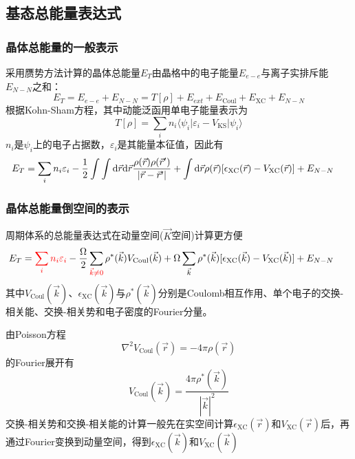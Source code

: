 \documentclass[cjk,slidestop,compress,mathserif,blue]{beamer}
\begin{document}
\subsection{基态总能量表达式}
\frame
{
	\frametitle{晶体总能量的一般表示}
采用赝势方法计算的晶体总能量$E_T$由晶格中的电子能量$E_{e-e}$与离子实排斥能$E_{N-N}$之和：
	\begin{displaymath}
		E_T=E_{e-e}+E_{N-N}=T[\rho]+E_{ext}+E_{\mathrm{Coul}}+E_{\mathrm{XC}}+E_{N-N}
	\end{displaymath}
根据\textrm{Kohn-Sham}方程，其中动能泛函用单电子能量表示为
\begin{displaymath}
	T[{\rho}]=\sum_in_i\langle\psi_i|\varepsilon_i-V_{\mathrm{KS}}|\psi_i\rangle
\end{displaymath}
$n_i$是$\psi_i$上的电子占据数，$\varepsilon_i$是其能量本征值，因此有
\begin{displaymath}
	\hspace*{-12.0pt}	E_T=\sum_in_i\varepsilon_i-\dfrac12\int\int\mathrm{d}\vec r\mathrm{d}\vec r\dfrac{\rho(\vec r)\rho(\vec r^{\prime})}{|\vec r-\vec r^{\prime}|}+\int\mathrm{d}\vec r\rho(\vec r)[\epsilon_{\mathrm{XC}}(\vec r)-V_{\mathrm{XC}}(\vec r)]+E_{N-N}
\end{displaymath}
}

\frame
{
	\frametitle{晶体总能量倒空间的表示}
周期体系的总能量表达式在动量空间($\vec K$空间)计算更方便
\begin{displaymath}
	\hspace*{-15.0pt}	E_T=\textcolor{red}{\sum_in_i\varepsilon_i}-\dfrac{\Omega}2\sum_{\textcolor{red}{\vec k\neq 0}}\rho^{\ast}(\vec k)V_{\mathrm{Coul}}(\vec k)+\Omega\sum_{\vec k}\rho^{\ast}(\vec k)[\epsilon_{\mathrm{XC}}(\vec k)-V_{\mathrm{XC}}(\vec k)]+E_{N-N}
\end{displaymath}
其中$V_{\mathrm{Coul}}(\vec k)$、$\epsilon_{\mathrm{XC}}(\vec k)$与$\rho^{\ast}(\vec k)$分别是\textrm{Coulomb}相互作用、单个电子的交换-相关能、交换-相关势和电子密度的\textrm{Fourier}分量。

由\textrm{Poisson}方程
\begin{displaymath}
	\nabla^2V_{\mathrm{Coul}}(\vec r)=-4\pi\rho(\vec r)
\end{displaymath}
的\textrm{Fourier}展开有
\begin{displaymath}
	V_{\mathrm{Coul}}(\vec k)=\dfrac{4\pi\rho^{\ast}(\vec k)}{|\vec k|^2}
\end{displaymath}
交换-相关势和交换-相关能的计算一般先在实空间计算$\epsilon_{\mathrm{XC}}(\vec r)$和$V_{\mathrm{XC}}(\vec r)$后，再通过\textrm{Fourier}变换到动量空间，得到$\epsilon_{\mathrm{XC}}(\vec k)$和$V_{\mathrm{XC}}(\vec k)$
}
\end{document}
